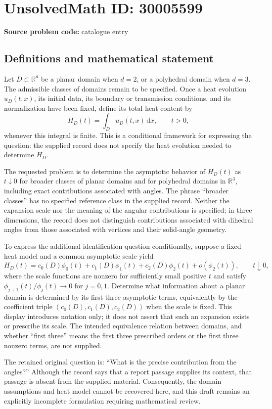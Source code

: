\documentclass[11pt]{article}
\newcommand{\R}{\mathbb{R}}
\begin{document}
\section*{UnsolvedMath ID: 30005599}
\textbf{Source problem code:} catalogue entry
\subsection{Definitions and mathematical statement}
Let \(D\subset\R^d\) be a planar domain when \(d=2\), or a polyhedral domain when \(d=3\). The admissible classes of domains remain to be specified. Once a heat evolution \(u_D(t,x)\), its initial data, its boundary or transmission conditions, and its normalization have been fixed, define its total heat content by
\[
H_D(t)=\int_D u_D(t,x)\,\mathrm{d}x,\qquad t>0,
\]
whenever this integral is finite. This is a conditional framework for expressing the question: the supplied record does not specify the heat evolution needed to determine \(H_D\).

The requested problem is to determine the asymptotic behavior of \(H_D(t)\) as \(t\downarrow0\) for broader classes of planar domains and for polyhedral domains in \(\R^3\), including exact contributions associated with angles. The phrase ``broader classes'' has no specified reference class in the supplied record. Neither the expansion scale nor the meaning of the angular contributions is specified; in three dimensions, the record does not distinguish contributions associated with dihedral angles from those associated with vertices and their solid-angle geometry.

To express the additional identification question conditionally, suppose a fixed heat model and a common asymptotic scale yield
\[
H_D(t)=c_0(D)\phi_0(t)+c_1(D)\phi_1(t)+c_2(D)\phi_2(t)+o\!\left(\phi_2(t)\right),
\qquad t\downarrow0,
\]
where the scale functions are nonzero for sufficiently small positive \(t\) and satisfy \(\phi_{j+1}(t)/\phi_j(t)\to0\) for \(j=0,1\). Determine what information about a planar domain is determined by its first three asymptotic terms, equivalently by the coefficient triple \((c_0(D),c_1(D),c_2(D))\) when the scale is fixed. This display introduces notation only; it does not assert that such an expansion exists or prescribe its scale. The intended equivalence relation between domains, and whether ``first three'' means the first three prescribed orders or the first three nonzero terms, are not supplied.

The retained original question is: ``What is the precise contribution from the angles?'' Although the record says that a report passage supplies its context, that passage is absent from the supplied material. Consequently, the domain assumptions and heat model cannot be recovered here, and this draft remains an explicitly incomplete formulation requiring mathematical review.
\end{document}
